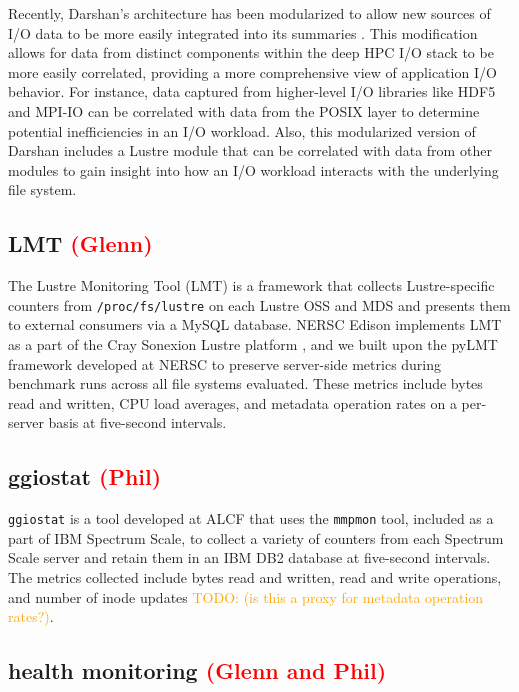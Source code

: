 \documentclass[conference,10pt,compsocconf]{IEEEtran}
\newcommand{\assign}[1]{\textcolor{red}{(#1)}}
\newcommand{\todo}[1]{\textcolor{Orange}{TODO: #1}}
\begin{document}
Recently, Darshan's architecture has been modularized to allow new sources
of I/O data to be more easily integrated into its summaries \cite{snyder2016modular}.
This modification allows for data from distinct components within the deep
HPC I/O stack to be more easily correlated, providing a more comprehensive view
of application I/O behavior. For instance, data captured from higher-level I/O
libraries like HDF5 and MPI-IO can be correlated with data from the POSIX layer
to determine potential inefficiencies in an I/O workload. Also, this modularized
version of Darshan includes a Lustre module that can be correlated with data from
other modules to gain insight into how an I/O workload interacts with the
underlying file system.

\subsection{LMT \assign{Glenn}}

The Lustre Monitoring Tool (LMT) is a framework that collects Lustre-specific
counters from \texttt{/proc/fs/lustre} on each Lustre OSS and MDS and presents
them to external consumers via a MySQL database.  NERSC Edison implements LMT
as a part of the Cray Sonexion Lustre platform \cite{Keopp2014}, and we built
upon the pyLMT framework developed at NERSC \cite{Uselton2009} to preserve
server-side metrics during benchmark runs across all file systems evaluated.
These metrics include bytes read and written, CPU load averages, and metadata
operation rates on a per-server basis at five-second intervals.

\subsection{ggiostat \assign{Phil}}

\texttt{ggiostat} is a tool developed at ALCF that uses the \texttt{mmpmon}
tool, included as a part of IBM Spectrum Scale, to collect a variety of counters
from each Spectrum Scale server and retain them in an IBM DB2 database at
five-second intervals.  The metrics collected include bytes read and written,
read and write operations, and number of inode updates \todo{(is this
a proxy for metadata operation rates?)}.

\subsection{health monitoring \assign{Glenn and Phil}}
\end{document}
